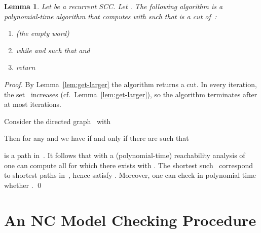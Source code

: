 \documentclass{elsarticle}
\newtheorem{lemma}[definition]{Lemma}
\begin{document}
\begin{lemma} \label{lem:compute-cut}
Let  be a recurrent SCC.
Let .
The following algorithm is a polynomial-time algorithm that computes  with  such that  is a cut of~:
\begin{enumerate}
\item  (the empty word)
\item while  and  such that  and  \\
\mbox{}\hspace{4mm} 
\item return 
\end{enumerate}
\end{lemma}
\begin{proof}
By Lemma~\ref{lem:get-larger} the algorithm returns a cut.
In every iteration, the set~ increases (cf.~Lemma~\ref{lem:get-larger}), so the algorithm terminates after at most  iterations.

Consider the directed graph~ with

Then for any  and  we have  if and only if there are  such that

is a path in~.
It follows that with a (polynomial-time) reachability analysis of~ one can compute all  for which there exists  with .
The shortest such~ correspond to shortest paths in~, hence satisfy .
Moreover, one can check in polynomial time whether .
\qed
\end{proof}

\section{An NC Model Checking Procedure} \label{sec:NC}
\end{document}
